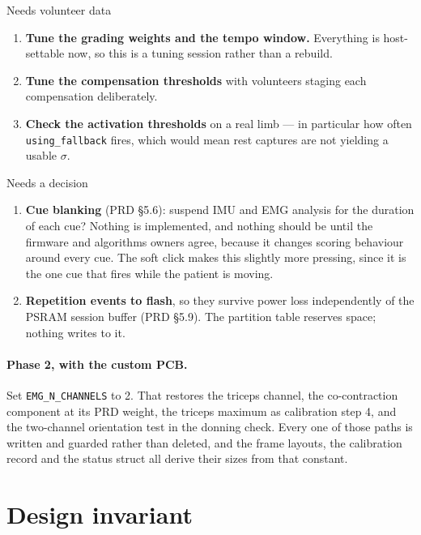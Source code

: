 \documentclass[11pt]{article}
\begin{document}
\begin{phasebox}{Needs volunteer data}
\begin{enumerate}
\item \textbf{Tune the grading weights and the tempo window.} Everything is
host-settable now, so this is a tuning session rather than a rebuild.
\item \textbf{Tune the compensation thresholds} with volunteers staging each
compensation deliberately.
\item \textbf{Check the activation thresholds} on a real limb --- in
particular how often \texttt{using\_fallback} fires, which would mean rest
captures are not yielding a usable $\sigma$.
\end{enumerate}
\end{phasebox}

\begin{phasebox}{Needs a decision}
\begin{enumerate}
\item \textbf{Cue blanking} (PRD \S5.6): suspend IMU and EMG analysis for the
duration of each cue? Nothing is implemented, and nothing should be until the
firmware and algorithms owners agree, because it changes scoring behaviour
around every cue. The soft click makes this slightly more pressing, since it
is the one cue that fires while the patient is moving.
\item \textbf{Repetition events to flash}, so they survive power loss
independently of the PSRAM session buffer (PRD \S5.9). The partition table
reserves space; nothing writes to it.
\end{enumerate}
\end{phasebox}

\paragraph{Phase 2, with the custom PCB.} Set \texttt{EMG\_N\_CHANNELS} to 2.
That restores the triceps channel, the co-contraction component at its PRD
weight, the triceps maximum as calibration step 4, and the two-channel
orientation test in the donning check. Every one of those paths is written and
guarded rather than deleted, and the frame layouts, the calibration record and
the status struct all derive their sizes from that constant.

\section{Design invariant}
\end{document}
